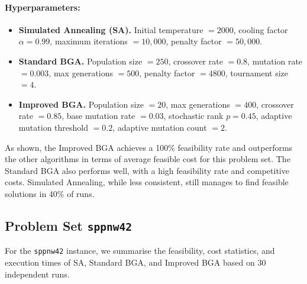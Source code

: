 \documentclass[12pt]{article}
\begin{document}
\paragraph{Hyperparameters:}
\vspace{-1.5em}
\begin{itemize}
    \item \textbf{Simulated Annealing (SA).} 
    Initial temperature $= 2000$, 
    cooling factor $\alpha = 0.99$, 
    maximum iterations $= 10,000$, 
    penalty factor $= 50,000$. 
    \item \textbf{Standard BGA.}
    Population size $= 250$, 
    crossover rate $= 0.8$, 
    mutation rate $= 0.003$, 
    max generations $= 500$, 
    penalty factor $= 4800$, 
    tournament size $= 4$.
    \item \textbf{Improved BGA.}
    Population size $= 20$, 
    max generations $= 400$, 
    crossover rate $= 0.85$, 
    base mutation rate $= 0.03$, 
    stochastic rank $p = 0.45$, 
    adaptive mutation threshold $= 0.2$, 
    adaptive mutation count $= 2$.
\end{itemize}

\noindent
As shown, the Improved BGA achieves a 100\% feasibility rate and outperforms the other algorithms in terms of average feasible cost for this problem set. The Standard BGA also performs well, with a high feasibility rate and competitive costs. Simulated Annealing, while less consistent, still manages to find feasible solutions in 40\% of runs.


\subsection{Problem Set \texttt{sppnw42}}
\label{subsec:sppnw42}

For the \texttt{sppnw42} instance, we summarise the feasibility, cost statistics, and execution times of SA, Standard BGA, and Improved BGA based on 30 independent runs.

\vspace{1em}
\end{document}
